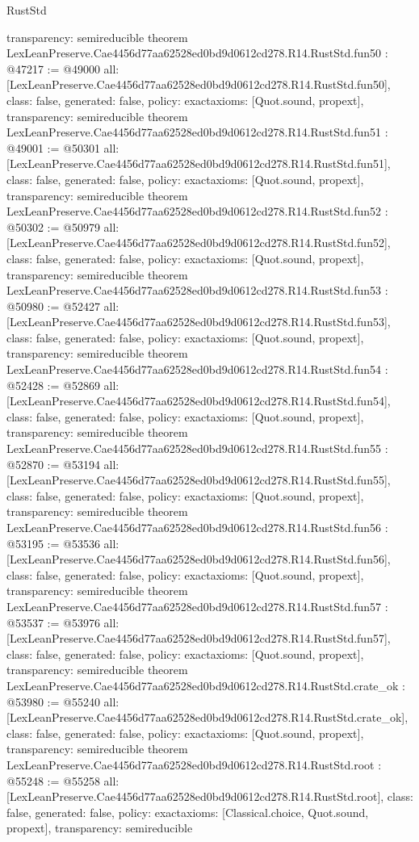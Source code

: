 \begin{lexlean}{RustStd}
\begin{coremodule}
{  transparency: semireducible
}
theorem LexLeanPreserve.Cae4456d77aa62528ed0bd9d0612cd278.R14.RustStd.fun50 : @47217 := @49000 {
  all: [LexLeanPreserve.Cae4456d77aa62528ed0bd9d0612cd278.R14.RustStd.fun50],
  class: false,
  generated: false,
  policy: exact{axioms: [Quot.sound, propext]},
  transparency: semireducible
}
theorem LexLeanPreserve.Cae4456d77aa62528ed0bd9d0612cd278.R14.RustStd.fun51 : @49001 := @50301 {
  all: [LexLeanPreserve.Cae4456d77aa62528ed0bd9d0612cd278.R14.RustStd.fun51],
  class: false,
  generated: false,
  policy: exact{axioms: [Quot.sound, propext]},
  transparency: semireducible
}
theorem LexLeanPreserve.Cae4456d77aa62528ed0bd9d0612cd278.R14.RustStd.fun52 : @50302 := @50979 {
  all: [LexLeanPreserve.Cae4456d77aa62528ed0bd9d0612cd278.R14.RustStd.fun52],
  class: false,
  generated: false,
  policy: exact{axioms: [Quot.sound, propext]},
  transparency: semireducible
}
theorem LexLeanPreserve.Cae4456d77aa62528ed0bd9d0612cd278.R14.RustStd.fun53 : @50980 := @52427 {
  all: [LexLeanPreserve.Cae4456d77aa62528ed0bd9d0612cd278.R14.RustStd.fun53],
  class: false,
  generated: false,
  policy: exact{axioms: [Quot.sound, propext]},
  transparency: semireducible
}
theorem LexLeanPreserve.Cae4456d77aa62528ed0bd9d0612cd278.R14.RustStd.fun54 : @52428 := @52869 {
  all: [LexLeanPreserve.Cae4456d77aa62528ed0bd9d0612cd278.R14.RustStd.fun54],
  class: false,
  generated: false,
  policy: exact{axioms: [Quot.sound, propext]},
  transparency: semireducible
}
theorem LexLeanPreserve.Cae4456d77aa62528ed0bd9d0612cd278.R14.RustStd.fun55 : @52870 := @53194 {
  all: [LexLeanPreserve.Cae4456d77aa62528ed0bd9d0612cd278.R14.RustStd.fun55],
  class: false,
  generated: false,
  policy: exact{axioms: [Quot.sound, propext]},
  transparency: semireducible
}
theorem LexLeanPreserve.Cae4456d77aa62528ed0bd9d0612cd278.R14.RustStd.fun56 : @53195 := @53536 {
  all: [LexLeanPreserve.Cae4456d77aa62528ed0bd9d0612cd278.R14.RustStd.fun56],
  class: false,
  generated: false,
  policy: exact{axioms: [Quot.sound, propext]},
  transparency: semireducible
}
theorem LexLeanPreserve.Cae4456d77aa62528ed0bd9d0612cd278.R14.RustStd.fun57 : @53537 := @53976 {
  all: [LexLeanPreserve.Cae4456d77aa62528ed0bd9d0612cd278.R14.RustStd.fun57],
  class: false,
  generated: false,
  policy: exact{axioms: [Quot.sound, propext]},
  transparency: semireducible
}
theorem LexLeanPreserve.Cae4456d77aa62528ed0bd9d0612cd278.R14.RustStd.crate_ok : @53980 := @55240 {
  all: [LexLeanPreserve.Cae4456d77aa62528ed0bd9d0612cd278.R14.RustStd.crate_ok],
  class: false,
  generated: false,
  policy: exact{axioms: [Quot.sound, propext]},
  transparency: semireducible
}
theorem LexLeanPreserve.Cae4456d77aa62528ed0bd9d0612cd278.R14.RustStd.root : @55248 := @55258 {
  all: [LexLeanPreserve.Cae4456d77aa62528ed0bd9d0612cd278.R14.RustStd.root],
  class: false,
  generated: false,
  policy: exact{axioms: [Classical.choice, Quot.sound, propext]},
  transparency: semireducible
}


\end{coremodule}
\end{lexlean}

